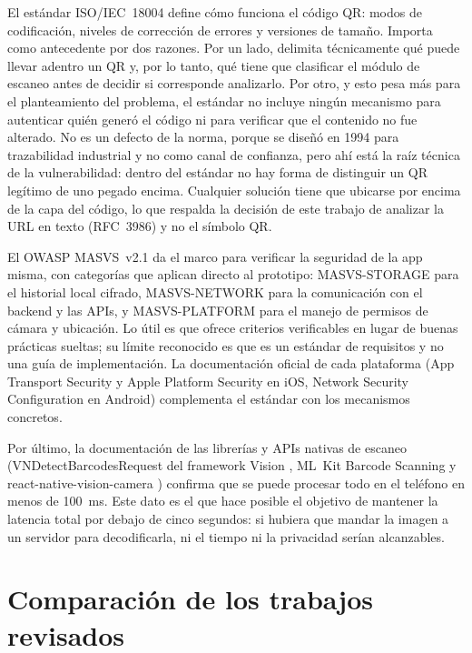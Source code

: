 El estándar ISO/IEC~18004 \cite{iso18004_2015,iso18004_2024} define cómo funciona el
código QR: modos de codificación, niveles de corrección de errores y versiones de
tamaño. Importa como antecedente por dos razones. Por un lado, delimita técnicamente
qué puede llevar adentro un QR y, por lo tanto, qué tiene que clasificar el módulo de
escaneo antes de decidir si corresponde analizarlo. Por otro, y esto pesa más para el
planteamiento del problema, el estándar no incluye ningún mecanismo para autenticar
quién generó el código ni para verificar que el contenido no fue alterado. No es un
defecto de la norma, porque se diseñó en 1994 para trazabilidad industrial
\cite{iso18004_2015} y no como canal de confianza, pero ahí está la raíz técnica de la
vulnerabilidad: dentro del estándar no hay forma de distinguir un QR legítimo de uno
pegado encima. Cualquier solución tiene que ubicarse por encima de la capa del código,
lo que respalda la decisión de este trabajo de analizar la URL en texto (RFC~3986) y no
el símbolo QR.

El OWASP MASVS~v2.1 \cite{owasp2024masvs} da el marco para verificar la seguridad de
la app misma, con categorías que aplican directo al prototipo: MASVS-STORAGE para el
historial local cifrado, MASVS-NETWORK para la comunicación con el backend y las APIs, y
MASVS-PLATFORM para el manejo de permisos de cámara y ubicación. Lo útil es que ofrece
criterios verificables en lugar de buenas prácticas sueltas; su límite reconocido es que
es un estándar de requisitos y no una guía de implementación. La documentación oficial de
cada plataforma (App Transport Security \cite{apple_ats} y Apple Platform Security
\cite{apple2024platformsecurity} en iOS, Network Security Configuration
\cite{android_netsecconfig} en Android) complementa el estándar con los mecanismos
concretos.

Por último, la documentación de las librerías y APIs nativas de escaneo
(VNDetectBarcodesRequest del framework Vision \cite{apple_vndetectbarcodes}, ML~Kit
Barcode Scanning \cite{google_mlkit_barcode} y react-native-vision-camera
\cite{rousavy_visioncamera}) confirma que se puede procesar todo en el teléfono en menos
de 100~ms. Este dato es el que hace posible el objetivo de mantener la latencia total
por debajo de cinco segundos: si hubiera que mandar la imagen a un servidor para
decodificarla, ni el tiempo ni la privacidad serían alcanzables.

\section{Comparación de los trabajos revisados}

